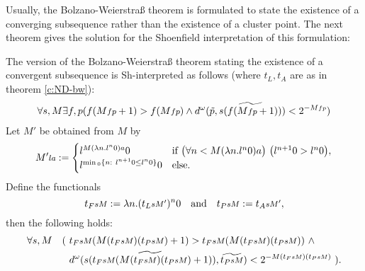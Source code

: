 Usually, the Bolzano-Weierstra\ss{} theorem is formulated to state 
the existence of a converging subsequence rather than the existence of
a cluster point. The next theorem gives the solution for the 
Shoenfield interpretation of this formulation: 

\begin{thm}\label{t:ND-ssbw}
The version of the Bolzano-Weierstra\ss{} theorem stating the existence 
of a convergent subsequence is Sh-interpreted as follows (where 
$t_L,t_A$ are as in theorem \ref{c:ND-bw}):
\begin{align*}
\forall s,M \exists f,p ( f(M\args{fp}+1) > f(M\args{fp})
\wedge
d^\omega ( \tilde{p},  \widetilde{s(f(M\args{fp}+1))} ) < 2^{-M\args{fp}}
)
\end{align*}
Let $M'$ be obtained from $M$ by 
\[
M'\args{la}:=\begin{cases}
l^{M(\lambda n . l^n0)a}0&\Tif\ \big(\forall n<M(\lambda n . 
l^n0)a\big)\ \big(l^{n+1}0>l^n0\big),\\
l^{\min{} _0\{n:\ l^{n+1}0\leq l^n0\}}0&\Telse.
\end{cases}
\] 
Define the functionals
\[
t_F\args{sM}:=\lambda n.(t_L\args{sM'})^n0\quad\text{and}\quad 
t_P\args{sM}:=t_A\args{sM'},
\]
then the following holds:
\begin{align*}
\forall s,M \quad (\ &t_F\args{sM}(M(t_F\args{sM})(t_P\args{sM})+1) > 
t_F\args{sM}(M(t_F\args{sM})(t_P\args{sM}))
\ \wedge\\
&d^\omega ( \widetilde { s(t_F\args{sM}(M(t_F\args{sM})(t_P\args{sM})+1)) } , 
\widetilde{t_P\args{sM}} ) < 2^{-M(t_F\args{sM})(t_P\args{sM})}
\ ).
\end{align*}
\end{thm}
